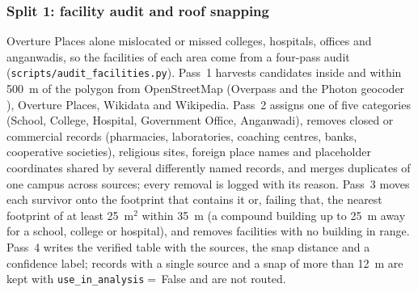 \documentclass[preprint,12pt]{elsarticle}
\begin{document}
\subsubsection{Split 1: facility audit and roof snapping}\label{sec:audit}
Overture Places alone mislocated or missed colleges, hospitals, offices and anganwadis, so the facilities of each area come from a four-pass audit (\texttt{scripts/audit\_facilities.py}). Pass~1 harvests candidates inside and within 500~m of the polygon from OpenStreetMap \cite{haklay2008osm} (Overpass and the Photon geocoder \cite{photon2026}), Overture Places, Wikidata and Wikipedia. Pass~2 assigns one of five categories (School, College, Hospital, Government Office, Anganwadi), removes closed or commercial records (pharmacies, laboratories, coaching centres, banks, cooperative societies), religious sites, foreign place names and placeholder coordinates shared by several differently named records, and merges duplicates of one campus across sources; every removal is logged with its reason. Pass~3 moves each survivor onto the footprint that contains it or, failing that, the nearest footprint of at least 25~m$^2$ within 35~m (a compound building up to 25~m away for a school, college or hospital), and removes facilities with no building in range. Pass~4 writes the verified table with the sources, the snap distance and a confidence label; records with a single source and a snap of more than 12~m are kept with \texttt{use\_in\_analysis}${}=$\,False and are not routed.
\end{document}
